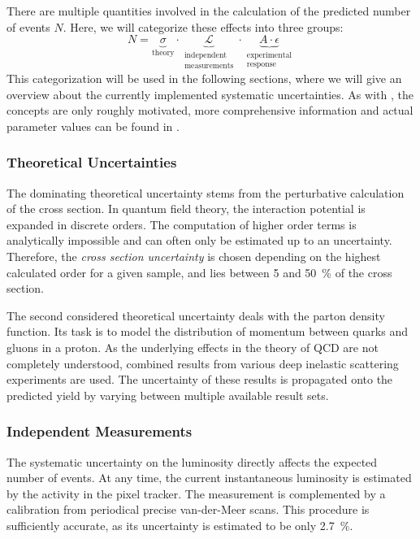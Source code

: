 There are multiple quantities involved in the calculation of the predicted number of events $N$. Here, we will categorize these effects into three groups:
\begin{equation}
N = \underbrace{\sigma}_\text{theory} \cdot \underbrace{\mathcal{L}}_{\substack{\text{independent} \\ \text{measurements}}} \cdot \underbrace{A \cdot \epsilon}_{\substack{\text{experimental} \\ \text{response}}}  
\end{equation}
This categorization will be used in the following sections, where we will give an overview about the currently implemented systematic uncertainties. As with , the concepts are only roughly motivated, more comprehensive information and actual parameter values can be found in \cite{Roemer:ModelUnspecificSearch}.

\subsubsection{Theoretical Uncertainties}
The dominating theoretical uncertainty stems from the perturbative calculation of the cross section. In quantum field theory, the interaction potential is expanded in discrete orders. The computation of higher order terms is analytically impossible and can often only be estimated up to an uncertainty. Therefore, the \emph{cross section uncertainty} is chosen depending on the highest calculated order for a given sample, and lies between \num{5} and \SI{50}{\percent} of the cross section.

The second considered theoretical uncertainty deals with the parton density function. Its task is to model the distribution of momentum between quarks and gluons in a proton. As the underlying effects in the theory of \ac{QCD} are not completely understood, combined results from various deep inelastic scattering experiments are used. The uncertainty of these results is propagated onto the predicted yield by varying between multiple available result sets.

\subsubsection{Independent Measurements}
The systematic uncertainty on the luminosity directly affects the expected number of events. 
At any time, the current instantaneous luminosity is estimated by the activity in the pixel tracker. The measurement is complemented by a calibration from periodical precise van-der-Meer scans.
This procedure is sufficiently accurate, as its uncertainty is estimated to be only \SI{2.7}{\percent}\cite{CMS:CMS-PAS-LUM-15-001}.

